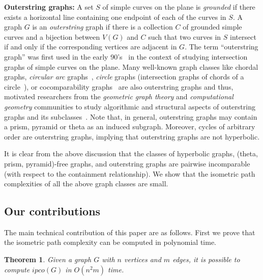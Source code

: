 \documentclass[a4paper]{article}
\newcommand{\ipco}[1]{ipco\left(#1\right)}
\newtheorem{theorem}{Theorem}
\begin{document}
 \smallskip
 \noindent
\textbf{Outerstring graphs:} A set $S$ of simple curves on the plane is \emph{grounded} if there exists a horizontal line containing one endpoint of each of the curves in $S$. A graph $G$ is an \emph{outerstring} graph if there is a collection $C$ of grounded simple curves and a bijection between $V(G)$ and $C$ such that two curves in $S$ intersect if and only if the corresponding vertices are adjacent in $G$. 
The term ``outerstring graph'' was first used in the early 90's~\cite{kratochvil1991string} in the context of studying intersection graphs of simple curves on the plane. Many well-known graph classes like chordal graphs, \emph{circular arc} graphs~\cite{francis2014forbidden}, \emph{circle} graphs (intersection graphs of chords of a circle~\cite{davies2021circle}), or cocomparability graphs~\cite{corneil2013ldfs} are also outerstring graphs and thus, motivated researchers from the \emph{geometric graph theory} and \emph{computational geometry} communities to study algorithmic and structural aspects of outerstring graphs and its subclasses~\cite{biedl2018size,bose2022computing,cardinal2017intersection,keil2017algorithm,rok2019outerstring}. Note that, in general, outerstring graphs may contain a prism, pyramid or theta as an induced subgraph. Moreover, cycles of arbitrary order are outerstring graphs, implying that outerstring graphs are not hyperbolic.

\smallskip

 It is clear from the above discussion that the classes of hyperbolic graphs, (theta, prism, pyramid)-free graphs, and outerstring graphs are {pairwise} incomparable (with respect to the containment relationship). We show that the isometric path complexities of all the above graph classes are small.

\subsection{Our contributions}


The main technical contribution of this paper are as follows. First we prove that the isometric path complexity can be computed in polynomial time.

\begin{theorem}
    \label{thm:ipcoInP}
    Given a graph $G$ with $n$ vertices and $m$ edges, it is possible to compute $\ipco{G}$ in $O(n^2m)$ time.
\end{theorem}
\end{document}

